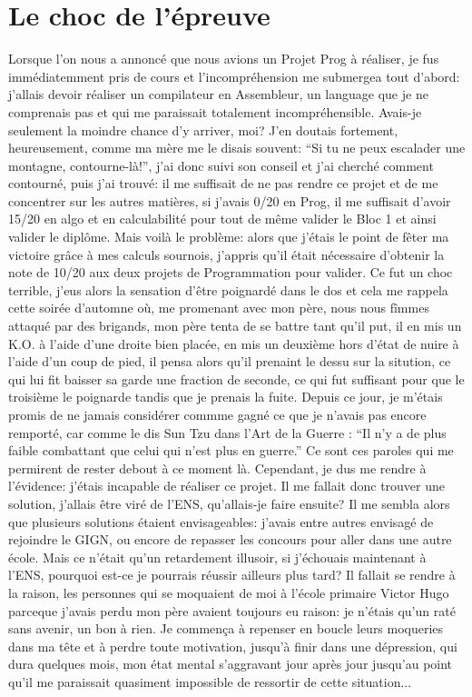 \documentclass{report}
\begin{document}
\section{Le choc de l'épreuve}
Lorsque l'on nous a annoncé que nous avions un Projet Prog à réaliser, je fus immédiatemment pris de cours et l'incompréhension me submergea tout d'abord: j'allais devoir réaliser un compilateur en Assembleur, un language que je ne comprenais pas et qui me paraissait totalement incompréhensible. Avais-je seulement la moindre chance d'y arriver, moi? J'en doutais fortement, heureusement, comme ma mère me le disais souvent: ``Si tu ne peux escalader une montagne, contourne-là!'', j'ai donc suivi son conseil et j'ai cherché comment contourné, puis j'ai trouvé: il me suffisait de ne pas rendre ce projet et de me concentrer sur les autres matières, si j'avais 0/20 en Prog, il me suffisait d'avoir 15/20 en algo et en calculabilité pour tout de même valider le Bloc 1 et ainsi valider le diplôme. Mais voilà le problème: alors que j'étais le point de fêter ma victoire grâce à mes calculs sournois, j'appris qu'il était nécessaire d'obtenir la note de 10/20 aux deux projets de Programmation pour valider. Ce fut un choc terrible, j'eus alors la sensation d'être poignardé dans le dos et cela me rappela cette soirée d'automne où, me promenant avec mon père, nous nous fîmmes attaqué par des brigands, mon père tenta de se battre tant qu'il put, il en mis un K.O. à l'aide d'une droite bien placée, en mis un deuxième hors d'état de nuire à l'aide d'un coup de pied, il pensa alors qu'il prenaint le dessu sur la sitution, ce qui lui fit baisser sa garde une fraction de seconde, ce qui fut suffisant pour que le troisième le poignarde tandis que je prenais la fuite. Depuis ce jour, je m'étais promis de ne jamais considérer commme gagné ce que je n'avais pas encore remporté, car comme le dis Sun Tzu dans l'Art de la Guerre : ``Il n'y a de plus faible combattant que celui qui n'est plus en guerre.'' Ce sont ces paroles qui me permirent de rester debout à ce moment là. Cependant, je dus me rendre à l'évidence: j'étais incapable de réaliser ce projet. Il me fallait donc trouver une solution, j'allais être viré de l'ENS, qu'allais-je faire ensuite? Il me sembla alors que plusieurs solutions étaient envisageables: j'avais entre autres envisagé de rejoindre le GIGN, ou encore de repasser les concours pour aller dans une autre école. Mais ce n'était qu'un retardement illusoir, si j'échouais maintenant à l'ENS, pourquoi est-ce je pourrais réussir ailleurs plus tard? Il fallait se rendre à la raison, les personnes qui se moquaient de moi à l'école primaire Victor Hugo parceque j'avais perdu mon père avaient toujours eu raison: je n'étais qu'un raté sans avenir, un bon à rien. Je commença à repenser en boucle leurs moqueries dans ma tête et à perdre toute motivation, jusqu'à finir dans une dépression, qui dura quelques mois, mon état mental s'aggravant jour après jour jusqu'au point qu'il me paraissait quasiment impossible de ressortir de cette situation...
\end{document}
